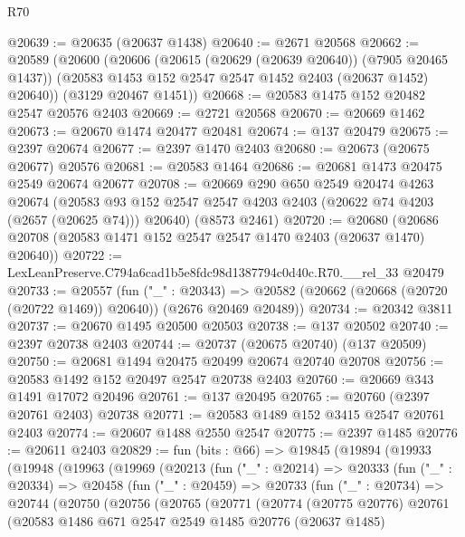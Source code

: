 \begin{lexlean}{R70}
\begin{coremodule}
@20639 := @20635 (@20637 @1438)
@20640 := @2671 @20568
@20662 := @20589
    (@20600
      (@20606
        (@20615 (@20629 (@20639 @20640)) (@7905 @20465 @1437))
        (@20583 @1453 @152 @2547 @2547 @1452 @2403 (@20637 @1452) @20640))
      (@3129 @20467 @1451))
@20668 := @20583 @1475 @152 @20482 @2547 @20576 @2403
@20669 := @2721 @20568
@20670 := @20669 @1462
@20673 := @20670 @1474 @20477 @20481
@20674 := @137 @20479
@20675 := @2397 @20674
@20677 := @2397 @1470 @2403
@20680 := @20673 (@20675 @20677) @20576
@20681 := @20583 @1464
@20686 := @20681 @1473 @20475 @2549 @20674 @20677
@20708 := @20669
    @290
    @650
    @2549
    @20474
    @4263
    @20674
    (@20583 @93 @152 @2547 @2547 @4203 @2403 (@20622 @74 @4203 (@2657 (@20625 @74))) @20640)
    (@8573 @2461)
@20720 := @20680 (@20686 @20708 (@20583 @1471 @152 @2547 @2547 @1470 @2403 (@20637 @1470) @20640))
@20722 := LexLeanPreserve.C794a6cad1b5e8fdc98d1387794c0d40c.R70.__rel_33 @20479
@20733 := @20557
    (fun ("_" : @20343) =>
    @20582 (@20662 (@20668 (@20720 (@20722 @1469)) @20640)) (@2676 @20469 @20489))
@20734 := @20342 @3811
@20737 := @20670 @1495 @20500 @20503
@20738 := @137 @20502
@20740 := @2397 @20738 @2403
@20744 := @20737 (@20675 @20740) (@137 @20509)
@20750 := @20681 @1494 @20475 @20499 @20674 @20740 @20708
@20756 := @20583 @1492 @152 @20497 @2547 @20738 @2403
@20760 := @20669 @343 @1491 @17072 @20496
@20761 := @137 @20495
@20765 := @20760 (@2397 @20761 @2403) @20738
@20771 := @20583 @1489 @152 @3415 @2547 @20761 @2403
@20774 := @20607 @1488 @2550 @2547
@20775 := @2397 @1485
@20776 := @20611 @2403
@20829 := fun (bits : @66) =>
  @19845
    (@19894
      (@19933
        (@19948
          (@19963
            (@19969
              (@20213
                (fun ("_" : @20214) =>
                @20333
                  (fun ("_" : @20334) =>
                  @20458
                    (fun ("_" : @20459) =>
                    @20733
                      (fun ("_" : @20734) =>
                      @20744
                        (@20750
                          (@20756
                            (@20765
                              (@20771
                                (@20774
                                  (@20775 @20776)
                                  @20761
                                  (@20583
                                    @1486
                                    @671
                                    @2547
                                    @2549
                                    @1485
                                    @20776
                                    (@20637 @1485)

\end{coremodule}
\end{lexlean}
